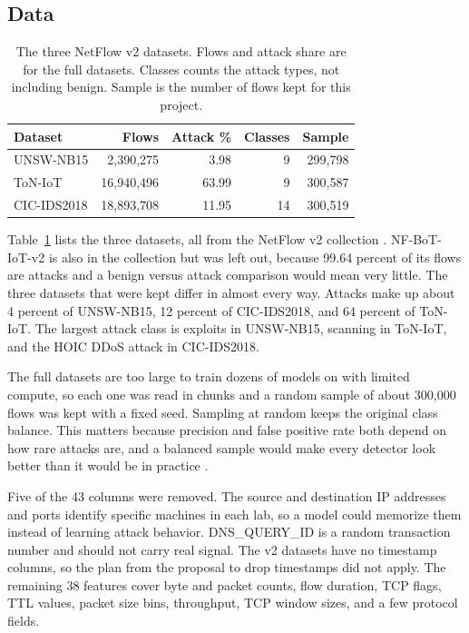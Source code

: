 \subsection{Data}

\begin{table}[t]
\centering
\small
\setlength{\tabcolsep}{5pt}
\begin{tabular}{lrrrr}
\toprule
Dataset & Flows & Attack \% & Classes & Sample \\
\midrule
UNSW-NB15 & 2,390,275 & 3.98 & 9 & 299,798 \\
ToN-IoT & 16,940,496 & 63.99 & 9 & 300,587 \\
CIC-IDS2018 & 18,893,708 & 11.95 & 14 & 300,519 \\
\bottomrule
\end{tabular}
\caption{The three NetFlow v2 datasets. Flows and attack share are for the full datasets. Classes counts the attack types, not including benign. Sample is the number of flows kept for this project.}
\label{tab:data}
\end{table}

Table~\ref{tab:data} lists the three datasets, all from the NetFlow v2 collection \cite{sarhan2022}. NF-BoT-IoT-v2 is also in the collection but was left out, because 99.64 percent of its flows are attacks and a benign versus attack comparison would mean very little. The three datasets that were kept differ in almost every way. Attacks make up about 4 percent of UNSW-NB15, 12 percent of CIC-IDS2018, and 64 percent of ToN-IoT. The largest attack class is exploits in UNSW-NB15, scanning in ToN-IoT, and the HOIC DDoS attack in CIC-IDS2018.

The full datasets are too large to train dozens of models on with limited compute, so each one was read in chunks and a random sample of about 300,000 flows was kept with a fixed seed. Sampling at random keeps the original class balance. This matters because precision and false positive rate both depend on how rare attacks are, and a balanced sample would make every detector look better than it would be in practice \cite{arp2022}.

Five of the 43 columns were removed. The source and destination IP addresses and ports identify specific machines in each lab, so a model could memorize them instead of learning attack behavior. DNS\_QUERY\_ID is a random transaction number and should not carry real signal. The v2 datasets have no timestamp columns, so the plan from the proposal to drop timestamps did not apply. The remaining 38 features cover byte and packet counts, flow duration, TCP flags, TTL values, packet size bins, throughput, TCP window sizes, and a few protocol fields.

